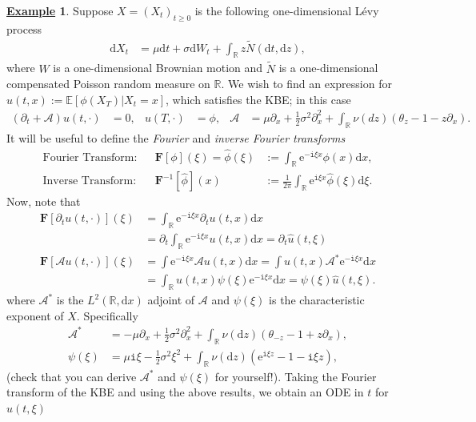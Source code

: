 \documentclass[12pt]{book}
\let\varphi\phi
\numberwithin{equation}{chapter}
\theoremstyle{plain}
\numberwithin{theorem}{section}
\theoremstyle{definition}
\newtheorem{example}[theorem]{\underline{Example}}
\numberwithin{exercise}{chapter}
\newcommand{\<}{\langle}
\renewcommand{\>}{\rangle}
\renewcommand{\(}{\left(}
\renewcommand{\)}{\right)}
\renewcommand{\[}{\left[}
\renewcommand{\]}{\right]}
\newcommand\Eb{\mathds{E}}
\newcommand\Rb{\mathds{R}}
\newcommand\Ac{\mathscr{A}}
\newcommand\sig{\sigma}
\newcommand\Fv{\pmb{F}}
\newcommand\varphih{\widehat{\varphi}}
\newcommand\uh{\widehat{u}}
\newcommand\Nt{\widetilde{N}}
\renewcommand\d{\partial}
\newcommand\ii{\mathtt{i}}
\newcommand\dd{\mathrm{d}}
\newcommand\ee{\mathrm{e}}
\begin{document}
\begin{example}
Suppose $X = (X_t)_{t \geq 0}$ is the following one-dimensional L\'evy process
\begin{align}
\dd X_t
	&=	\mu \dd t + \sig \dd W_t + \int_\Rb z \Nt( \dd t , \dd z ) ,
\end{align}
where $W$ is a one-dimensional Brownian motion and $\Nt$ is a one-dimensional compensated Poisson random measure on $\Rb$.
We wish to find an expression for $u(t,x) := \Eb[ \varphi(X_T) | X_t = x ]$, which satisfies the KBE; in this case
\begin{align}
(\d_t + \Ac ) u(t, \cdot)
	&=	0 , &
u(T,\cdot)
	&=	\varphi , &
\Ac
	&=	\mu \d_x + \tfrac{1}{2} \sig^2 \d_x^2 + \int_\Rb \nu(dz) ( \theta_z - 1 - z \d_x) .
\end{align}
It will be useful to define the \emph{Fourier} and \emph{inverse Fourier transforms}
\begin{align}
\text{Fourier Transform}:&&
\Fv [\varphi](\xi) = \varphih(\xi)
	&:=	\int_\Rb \ee^{- \ii \xi x} \varphi(x) \dd x , \\
\text{Inverse Transform}:&&
\Fv^{-1}[ \varphih](x)
	&:=	\frac{1}{2 \pi} \int_\Rb \ee^{\ii \xi x} \varphih(\xi) \dd \xi .
\end{align}
Now, note that
\begin{align}
\Fv[ \d_t u(t,\cdot) ](\xi)
	&=	\int_\Rb \ee^{- \ii \xi x} \d_t u(t,x) \dd x \\
	&=		\d_t \int_\Rb \ee^{- \ii \xi x} u(t,x) \dd x 
	=		\d_t \uh(t,\xi) \\
\Fv[ \Ac u(t,\cdot) ](\xi)
	&=	\int  \ee^{- \ii \xi x} \Ac u(t,x) \dd x 
	=		\int u(t,x) {\Ac}^* \ee^{- \ii \xi x} \dd x \\
	&=	\int_\Rb u(t,x) \psi(\xi) \ee^{- \ii \xi x} \dd x 
	=		\psi(\xi) \uh(t,\xi) .
\end{align}
where $\Ac^*$ is the $L^2(\Rb,\dd x)$ adjoint of $\Ac$ and $\psi(\xi)$ is the characteristic exponent of $X$.  Specifically
\begin{align}
\Ac^*
	&=	- \mu \d_x + \tfrac{1}{2} \sig^2 \d_x^2 + \int_\Rb \nu(\dd z) ( \theta_{-z} - 1 + z \d_x) , \\
\psi(\xi)
	&=	\mu \ii \xi - \tfrac{1}{2} \sig^2 \xi^2 + \int_\Rb \nu(\dd z) ( \ee^{\ii \xi z } - 1 - \ii \xi z ) ,
\end{align}
(check that you can derive $\Ac^*$ and $\psi(\xi)$ for yourself!).  Taking the Fourier transform of the KBE and using the above results, we obtain an ODE in $t$ for $\uh(t,\xi)$
\begin{align}

\end{align}
\end{example}
\end{document}
